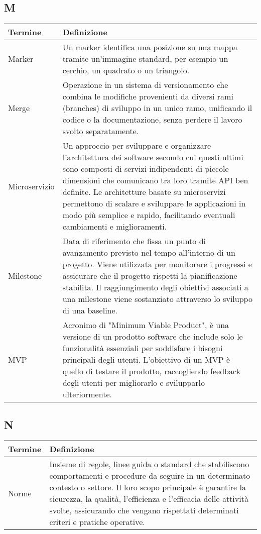 \documentclass[10pt]{article}
\begin{document}
\subsection{M} %
\begin{longtable}{|>{\centering\arraybackslash}m{2.5cm}|>{\arraybackslash}m{12.5cm}|}
\hline
\rowcolor[gray]{0.8}
\textbf{Termine} & \textbf{Definizione}\\
\endhead
\hline
Marker & Un marker identifica una posizione su una mappa tramite un'immagine standard, per esempio un cerchio, un quadrato o un triangolo.\\
\hline
Merge & Operazione in un sistema di versionamento che combina le modifiche provenienti da diversi rami (branches) di sviluppo in un unico ramo, unificando il codice o la documentazione, senza perdere il lavoro svolto separatamente.\\
\hline
Microservizio & Un approccio per sviluppare e organizzare l'architettura dei software secondo cui questi ultimi sono composti di servizi indipendenti di piccole dimensioni che comunicano tra loro tramite API ben definite. Le architetture basate su microservizi permettono di scalare e sviluppare le applicazioni in modo più semplice e rapido, facilitando eventuali cambiamenti e miglioramenti.\\
\hline
Milestone & Data di riferimento che fissa un punto di avanzamento previsto nel tempo all'interno di un progetto. Viene utilizzata per monitorare i progressi e assicurare che il progetto rispetti la pianificazione stabilita. Il raggiungimento degli obiettivi associati a una milestone viene sostanziato attraverso lo sviluppo di una baseline.\\
\hline
MVP & Acronimo di "Minimum Viable Product", è una versione di un prodotto software che include solo le funzionalità essenziali per soddisfare i bisogni principali degli utenti. L'obiettivo di un MVP è quello di testare il prodotto, raccogliendo feedback degli utenti per migliorarlo e svilupparlo ulteriormente.\\
\hline
\end{longtable}

\subsection{N} %
\begin{longtable}{|>{\centering\arraybackslash}m{2.5cm}|>{\arraybackslash}m{12.5cm}|}
\hline
\rowcolor[gray]{0.8}
\textbf{Termine} & \textbf{Definizione}\\
\endhead
\hline
Norme & Insieme di regole, linee guida o standard che stabiliscono comportamenti e procedure da seguire in un determinato contesto o settore. Il loro scopo principale è garantire la sicurezza, la qualità, l'efficienza e l'efficacia delle attività svolte, assicurando che vengano rispettati determinati criteri e pratiche operative.\\
\hline
\end{longtable}
\end{document}
